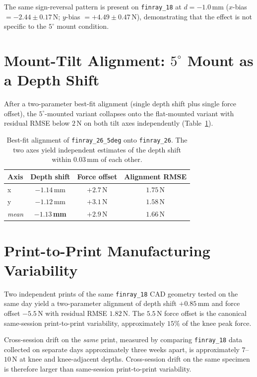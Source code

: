 The same sign-reversal pattern is present on \texttt{finray\_18} at
$d = -1.0$\,mm ($x$-bias $= -2.44 \pm 0.17$\,N; $y$-bias
$= +4.49 \pm 0.47$\,N), demonstrating that the effect is not specific to
the $5^{\circ}$ mount condition.

\section{Mount-Tilt Alignment: $5^{\circ}$ Mount as a Depth Shift}
\label{sec:mount-tilt-results}

After a two-parameter best-fit alignment (single depth shift plus
single force offset), the $5^{\circ}$-mounted variant collapses onto
the flat-mounted variant with residual RMSE below $2$\,N on both tilt
axes independently (Table~\ref{tab:mount-tilt-alignment}).

\begin{table}[ht]
\centering
\caption[Mount tilt equivalence]{Best-fit alignment of
\texttt{finray\_26\_5deg} onto \texttt{finray\_26}. The two axes yield
independent estimates of the depth shift within $0.03$\,mm of each other.}
\label{tab:mount-tilt-alignment}
\begin{tabular}{lccc}
\toprule
Axis & Depth shift & Force offset & Alignment RMSE \\
\midrule
x     & $-1.14$\,mm & $+2.7$\,N & $1.75$\,N \\
y     & $-1.12$\,mm & $+3.1$\,N & $1.58$\,N \\
\emph{mean} & $\mathbf{-1.13}$\,\textbf{mm} & $+2.9$\,N & $1.66$\,N \\
\bottomrule
\end{tabular}
\end{table}

\section{Print-to-Print Manufacturing Variability}
\label{sec:manufacturing-results}

Two independent prints of the same \texttt{finray\_18} CAD geometry
tested on the same day yield a two-parameter alignment of depth shift
$+0.85$\,mm and force offset $-5.5$\,N with residual RMSE $1.82$\,N.
The $5.5$\,N force offset is the canonical same-session print-to-print
variability, approximately $15\%$ of the knee peak force.

Cross-session drift on the \emph{same} print, measured by comparing
\texttt{finray\_18} data collected on separate days approximately three
weeks apart, is approximately $7$--$10$\,N at knee and knee-adjacent
depths. Cross-session drift on the same specimen is therefore larger
than same-session print-to-print variability.


